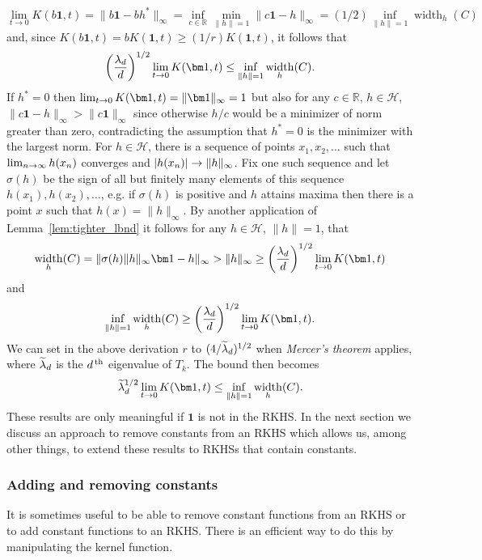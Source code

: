 \documentclass[10pt]{amsart}
\theoremstyle{definition}\newtheorem{defi}[theo]{Definition}\newtheorem{rema}[theo]{Remark}\newtheorem{exam}[theo]{Example}\newtheorem{exem}[theo]{Example}\newtheorem{nota}[theo]{Notation}
\theoremstyle{remark}
\DeclareMathOperator{\diam}{width}
\newcommand{\R}{\mathbb{R}}
\newcommand{\cH}{\mathcal{H}}
\let\oldtilde\tilde
\renewcommand*{\tilde}[1]{\mathchoice{\widetilde{#1}}{\widetilde{#1}}{\oldtilde{#1}}{\oldtilde{#1}}}
\renewcommand*{\to}{\mathchoice{\longrightarrow}{\rightarrow}{\rightarrow}{\rightarrow}}
\let\originalleft\left
\let\originalright\right
\renewcommand{\left}{\mathopen{}\mathclose\bgroup\originalleft}
\renewcommand{\right}{\aftergroup\egroup\originalright}
\begin{document}
\[
\lim_{t \rightarrow 0} K(b \bm 1,t) = \|b\bm 1 - b h^*\|_\infty = \inf_{c\in\R} \min_{\|h\|=1} \|c\bm 1 - h\|_\infty = (1/2) \inf_{\|h\| =1} \diam_h(C)
\]
and, since $K(b\bm 1,t) = b K(\bm 1,t) \geq (1/r) K(\bm 1,t)$, it follows that
\begin{equation}\label{eq:K_functional_LB}
\left(\frac{\lambda_d}{d}\right)^{1/2} \lim_{t\rightarrow 0} K(\bm 1,t) \leq \inf_{\|h\|=1} \diam_h(C).
\end{equation}
If $h^* = 0$ then $\lim_{t\to 0} K(\bm 1,t) = \|\bm 1\|_\infty = 1$ but also for any $c\in \R$, $h \in \cH$, $\|c \bm 1 - h\|_\infty >
\|c \bm 1\|_\infty$ since otherwise $h/c$ would be a minimizer of norm greater than zero, contradicting the assumption that $h^* = 0 $ is the minimizer with the largest norm. For $h \in \cH$, there is a sequence of points $x_1,x_2,\dots$ such that $\lim_{n\to \infty} h(x_n)$ converges and $|h(x_n)|\to \|h\|_\infty$. Fix one such sequence and let $\sigma(h)$ be the sign of all but finitely many elements of this sequence $h(x_1),h(x_2),\dots$, e.g. if $\sigma(h)$ is positive and $h$ attains maxima then there is a point $x$ such that $h(x) = \|h\|_\infty$. By another application of Lemma~\ref{lem:tighter_lbnd} it follows for any $h\in \cH$, $\|h\|=1$, that
\[
\diam_h(C) = \| \sigma(h) \|h\|_\infty \bm 1 - h \|_\infty > \|h\|_\infty \geq \left(\frac{\lambda_d}{d}\right)^{1/2} \lim_{t\to 0} K(\bm 1,t)
\]
and
\[
\inf_{\|h\|=1} \diam_h(C) \geq \left(\frac{\lambda_d}{d}\right)^{1/2} \lim_{t\to 0} K(\bm 1,t).
\]
We can set in the above derivation $r$ to $(4/\tilde \lambda_d)^{1/2}$ when \emph{Mercer's theorem} applies, where $\tilde \lambda_d$ is the $d^{\,\rm th}$ eigenvalue of $T_k$. The bound then becomes
\[
\tilde \lambda_d^{1/2} \lim_{t\rightarrow 0} K(\bm 1,t) \leq \inf_{\|h\|=1} \diam_h(C).
\]
These results are only meaningful if $\bm 1$ is not in the RKHS. In the next section we discuss an approach to remove constants from an RKHS which allows us, among other things, to extend these results to RKHSs that contain constants.



\subsubsection{Adding and removing constants} \label{sec:add_remove_constants}
It is sometimes useful to be able to remove constant functions from an RKHS or to add constant functions to an RKHS. There is an efficient way to do this by manipulating the kernel function.
\end{document}
